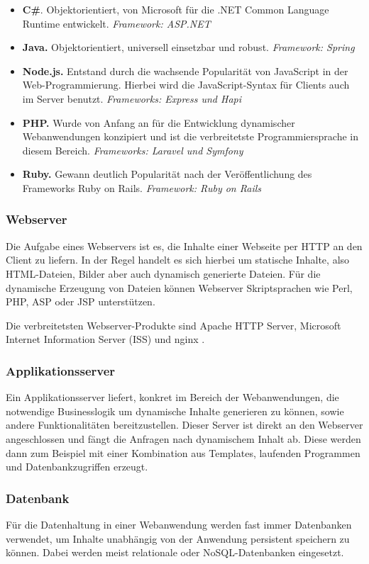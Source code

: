 \begin{itemize}
	\item \textbf{C\#}. Objektorientiert, von Microsoft für die .NET Common Language Runtime entwickelt. \textit{Framework: ASP.NET}
	\item \textbf{Java.} Objektorientiert, universell einsetzbar und robust. \textit{Framework: Spring}
	\item \textbf{Node.js.} Entstand durch die wachsende Popularität von JavaScript in der Web-Programmierung. Hierbei wird die JavaScript-Syntax für Clients auch im Server benutzt. \textit{Frameworks: Express und Hapi}
	\item \textbf{PHP.} Wurde von Anfang an für die Entwicklung dynamischer Webanwendungen konzipiert und ist die verbreitetste Programmiersprache in diesem Bereich. \textit{Frameworks: Laravel und Symfony}
	\item \textbf{Ruby.} Gewann deutlich Popularität nach der Veröffentlichung des Frameworks Ruby on Rails. \textit{Framework: Ruby on Rails}
\end{itemize}

\subsubsection{Webserver}
Die Aufgabe eines Webservers ist es, die Inhalte einer Webseite per \acs{HTTP} an den Client zu liefern. In der Regel handelt es sich hierbei um statische Inhalte, also \acs{HTML}-Dateien, Bilder aber auch dynamisch generierte Dateien.
Für die dynamische Erzeugung von Dateien können Webserver Skriptsprachen wie Perl, PHP, ASP oder JSP unterstützen.

Die verbreitetsten Webserver-Produkte sind Apache \acs{HTTP} Server, Microsoft Internet Information Server (\acs{ISS}) und nginx \cite{Rouse2012}.

\subsubsection{Applikationsserver}
Ein Applikationsserver liefert, konkret im Bereich der Webanwendungen, die notwendige Businesslogik um dynamische Inhalte generieren zu können, sowie andere Funktionalitäten bereitzustellen. Dieser Server ist direkt an den Webserver angeschlossen und fängt die Anfragen nach dynamischem Inhalt ab.
Diese werden dann zum Beispiel mit einer Kombination aus Templates, laufenden Programmen und Datenbankzugriffen erzeugt. \cite{ITWissen.info2013}

\subsubsection{Datenbank}
Für die Datenhaltung in einer Webanwendung werden fast immer Datenbanken verwendet, um Inhalte unabhängig von der Anwendung persistent speichern zu können.
Dabei werden meist relationale oder \acs{NoSQL}-Datenbanken eingesetzt.

